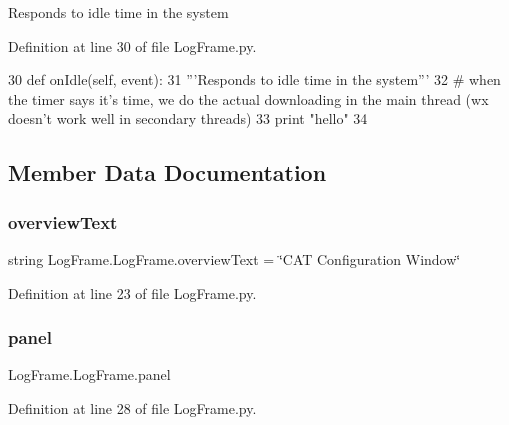 \begin{DoxyVerb}Responds to idle time in the system\end{DoxyVerb}
 

Definition at line 30 of file Log\+Frame.\+py.


\begin{DoxyCode}
30     \textcolor{keyword}{def }onIdle(self, event):
31         \textcolor{stringliteral}{'''Responds to idle time in the system'''}
32         \textcolor{comment}{# when the timer says it's time, we do the actual downloading in the main thread (wx doesn't work
       well in secondary threads)}
33         \textcolor{keywordflow}{print} \textcolor{stringliteral}{"hello"}
34         
\end{DoxyCode}


\subsection{Member Data Documentation}
\mbox{\label{classLogFrame_1_1LogFrame_a59c2a62bec07d62ee3db2615338443ae}} 
\subsubsection{\texorpdfstring{overview\+Text}{overviewText}}
{\footnotesize\ttfamily string Log\+Frame.\+Log\+Frame.\+overview\+Text = \char`\"{}C\+AT Configuration Window\char`\"{}\hspace{0.3cm}{\ttfamily [static]}}



Definition at line 23 of file Log\+Frame.\+py.

\mbox{\label{classLogFrame_1_1LogFrame_af2f7bf9b22dcc769064bfdc91296977e}} 
\subsubsection{\texorpdfstring{panel}{panel}}
{\footnotesize\ttfamily Log\+Frame.\+Log\+Frame.\+panel}



Definition at line 28 of file Log\+Frame.\+py.



